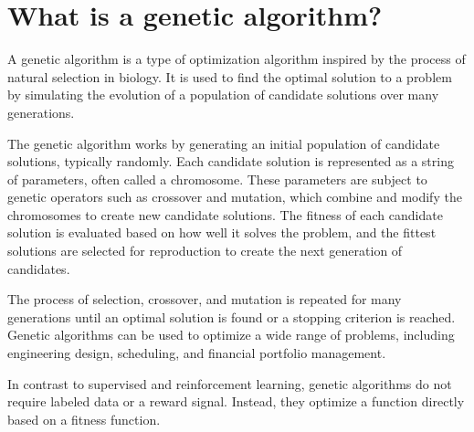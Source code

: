 \section{What is a genetic algorithm?}
A genetic algorithm is a type of optimization algorithm inspired by the process of natural selection in biology. It is used to find the optimal solution to a problem by simulating the evolution of a population of candidate solutions over many generations.

The genetic algorithm works by generating an initial population of candidate solutions, typically randomly. Each candidate solution is represented as a string of parameters, often called a chromosome. These parameters are subject to genetic operators such as crossover and mutation, which combine and modify the chromosomes to create new candidate solutions. The fitness of each candidate solution is evaluated based on how well it solves the problem, and the fittest solutions are selected for reproduction to create the next generation of candidates.

The process of selection, crossover, and mutation is repeated for many generations until an optimal solution is found or a stopping criterion is reached. Genetic algorithms can be used to optimize a wide range of problems, including engineering design, scheduling, and financial portfolio management.

In contrast to supervised and reinforcement learning, genetic algorithms do not require labeled data or a reward signal. Instead, they optimize a function directly based on a fitness function.

